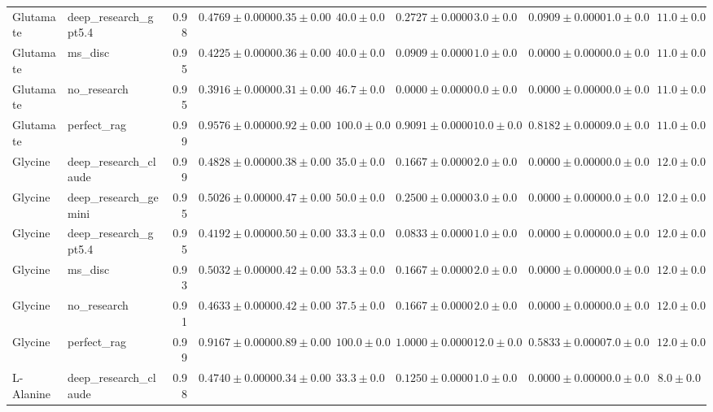 \begin{table}[htbp]
\begin{tabular}{llrrrrrrrrr}
Glutamate & deep_research_gpt5.4 & 0.98 & $0.4769 \pm 0.0000$ & $0.35 \pm 0.00$ & $40.0 \pm 0.0$ & $0.2727 \pm 0.0000$ & $3.0 \pm 0.0$ & $0.0909 \pm 0.0000$ & $1.0 \pm 0.0$ & $11.0 \pm 0.0$ \\
Glutamate & ms_disc & 0.95 & $0.4225 \pm 0.0000$ & $0.36 \pm 0.00$ & $40.0 \pm 0.0$ & $0.0909 \pm 0.0000$ & $1.0 \pm 0.0$ & $0.0000 \pm 0.0000$ & $0.0 \pm 0.0$ & $11.0 \pm 0.0$ \\
Glutamate & no_research & 0.95 & \cellcolor{red!25}$0.3916 \pm 0.0000$ & $0.31 \pm 0.00$ & $46.7 \pm 0.0$ & $0.0000 \pm 0.0000$ & $0.0 \pm 0.0$ & $0.0000 \pm 0.0000$ & $0.0 \pm 0.0$ & $11.0 \pm 0.0$ \\
Glutamate & perfect_rag & 0.99 & \cellcolor{green!25}$0.9576 \pm 0.0000$ & $0.92 \pm 0.00$ & $100.0 \pm 0.0$ & $0.9091 \pm 0.0000$ & $10.0 \pm 0.0$ & $0.8182 \pm 0.0000$ & $9.0 \pm 0.0$ & $11.0 \pm 0.0$ \\
\midrule
Glycine & deep_research_claude & 0.99 & $0.4828 \pm 0.0000$ & $0.38 \pm 0.00$ & $35.0 \pm 0.0$ & $0.1667 \pm 0.0000$ & $2.0 \pm 0.0$ & $0.0000 \pm 0.0000$ & $0.0 \pm 0.0$ & $12.0 \pm 0.0$ \\
Glycine & deep_research_gemini & 0.95 & $0.5026 \pm 0.0000$ & $0.47 \pm 0.00$ & $50.0 \pm 0.0$ & $0.2500 \pm 0.0000$ & $3.0 \pm 0.0$ & $0.0000 \pm 0.0000$ & $0.0 \pm 0.0$ & $12.0 \pm 0.0$ \\
Glycine & deep_research_gpt5.4 & 0.95 & \cellcolor{red!25}$0.4192 \pm 0.0000$ & $0.50 \pm 0.00$ & $33.3 \pm 0.0$ & $0.0833 \pm 0.0000$ & $1.0 \pm 0.0$ & $0.0000 \pm 0.0000$ & $0.0 \pm 0.0$ & $12.0 \pm 0.0$ \\
Glycine & ms_disc & 0.93 & $0.5032 \pm 0.0000$ & $0.42 \pm 0.00$ & $53.3 \pm 0.0$ & $0.1667 \pm 0.0000$ & $2.0 \pm 0.0$ & $0.0000 \pm 0.0000$ & $0.0 \pm 0.0$ & $12.0 \pm 0.0$ \\
Glycine & no_research & 0.91 & $0.4633 \pm 0.0000$ & $0.42 \pm 0.00$ & $37.5 \pm 0.0$ & $0.1667 \pm 0.0000$ & $2.0 \pm 0.0$ & $0.0000 \pm 0.0000$ & $0.0 \pm 0.0$ & $12.0 \pm 0.0$ \\
Glycine & perfect_rag & 0.99 & \cellcolor{green!25}$0.9167 \pm 0.0000$ & $0.89 \pm 0.00$ & $100.0 \pm 0.0$ & $1.0000 \pm 0.0000$ & $12.0 \pm 0.0$ & $0.5833 \pm 0.0000$ & $7.0 \pm 0.0$ & $12.0 \pm 0.0$ \\
\midrule
L-Alanine & deep_research_claude & 0.98 & \cellcolor{red!25}$0.4740 \pm 0.0000$ & $0.34 \pm 0.00$ & $33.3 \pm 0.0$ & $0.1250 \pm 0.0000$ & $1.0 \pm 0.0$ & $0.0000 \pm 0.0000$ & $0.0 \pm 0.0$ & $8.0 \pm 0.0$ \\

\end{tabular}
\end{table}

